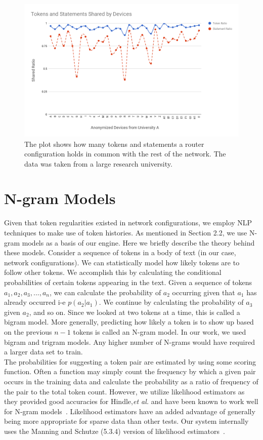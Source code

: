 \documentclass[../thesis.tex]{subfiles}
\begin{document}
\begin{figure}[H]
	\centering
	\includegraphics[width=\textwidth]{chart.png}
	\caption{The plot shows how many tokens and statements a router configuration holds in common with the rest of the network. The data was taken from a large research university.}
\end{figure}

\section{N-gram Models}

Given that token regularities existed in network configurations, we employ NLP techniques to make use of token histories. As mentioned in Section 2.2, we use N-gram models as a basis of our engine. Here we briefly describe the theory behind these models. Consider a sequence of tokens in a body of text (in our case, network configurations). We can statistically model how likely tokens are to follow other tokens. We accomplish this by calculating the conditional probabilities of certain tokens appearing in the text. Given a sequence of tokens $a_1,a_2,a_3,...,a_n$, we can calculate the probability of $a_2$ occurring given that $a_1$ has already occurred i-e $p(a_2 | a_1)$. We continue by calculating the probability of $a_3$ given $a_2$, and so on. Since we looked at two tokens at a time, this is called a bigram model. More generally, predicting how likely a token is to show up based on the previous $n-1$ tokens is called an N-gram model. In our work, we used bigram and trigram models. Any higher number of N-grams would have required a larger data set to train.\\

The probabilities for suggesting a token pair are estimated by using some scoring function. Often a function may simply count the frequency by which a given pair occurs in the training data and calculate the probability as a ratio of frequency of the pair to the total token count. However, we utilize likelihood estimators as they provided good accuracies for Hindle,\textit{et al.} and have been known to work well for N-gram models~\cite{manning}. Likelihood estimators have an added advantage of generally being more appropriate for sparse data than other tests. Our system internally uses the Manning and Schutze (5.3.4) version of likelihood estimators~\cite{manning}.
\end{document}
